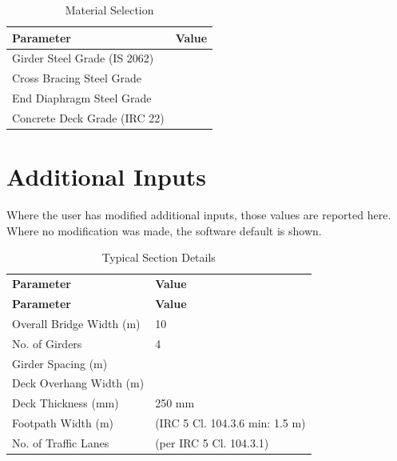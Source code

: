 \documentclass[12pt,a4paper]{report}
\numberwithin{figure}{chapter}
\begin{document}
\begin{table}[H]
\centering
{}
\caption{Material Selection}
\begin{tabular}{|L{7.29cm}|L{7.29cm}|}
\hline
\textbf{Parameter} & \textbf{Value} \\
\hline
Girder Steel Grade (IS 2062) &  \\
\hline
Cross Bracing Steel Grade &  \\
\hline
End Diaphragm Steel Grade &  \\
\hline
Concrete Deck Grade (IRC 22) &  \\
\hline
\end{tabular}
\end{table}
\vspace{0.4cm}

\section{Additional Inputs}
\label{sec:additional-inputs}

Where the user has modified additional inputs, those values are reported here. Where no modification was made, the software default is shown.

\vspace{0.8cm}

\begin{longtable}{|L{7.29cm}|L{7.29cm}|}
\caption{Typical Section Details}\\
\hline
\textbf{Parameter} & \textbf{Value} \\
\hline
\endfirsthead
\hline
\textbf{Parameter} & \textbf{Value} \\
\hline
\endhead
Overall Bridge Width (m) & 10 \\
\hline
No. of Girders & 4 \\
\hline
Girder Spacing (m) &  \\
\hline
Deck Overhang Width (m) &  \\
\hline
Deck Thickness (mm) & 250 mm \\
\hline
Footpath Width (m) &  (IRC 5 Cl. 104.3.6 min: 1.5 m) \\
\hline
No. of Traffic Lanes &  (per IRC 5 Cl. 104.3.1) \\
\hline
\end{longtable}

\vspace{0.8em}
\end{document}
